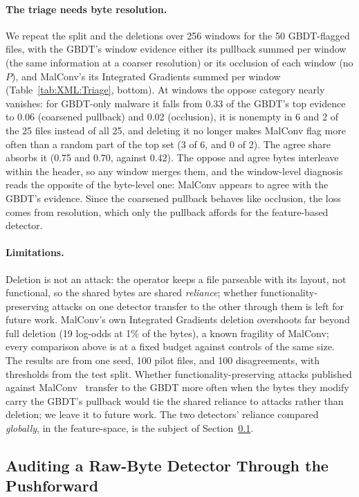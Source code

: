 \paragraph{The triage needs byte resolution.} We repeat the split and the deletions over 256 windows for the 50 GBDT-flagged files, with the GBDT's window evidence either its pullback summed per window (the same information at a coarser resolution) or its occlusion of each window (no $P$), and MalConv's its Integrated Gradients summed per window (Table~\ref{tab:XML:Triage}, bottom). At windows the oppose category nearly vanishes: for GBDT-only malware it falls from 0.33 of the GBDT's top evidence to 0.06 (coarsened pullback) and 0.02 (occlusion), it is nonempty in 6 and 2 of the 25 files instead of all 25, and deleting it no longer makes MalConv flag more often than a random part of the top set (3 of 6, and 0 of 2). The agree share absorbs it (0.75 and 0.70, against 0.42). The oppose and agree bytes interleave within the header, so any window merges them, and the window-level diagnosis reads the opposite of the byte-level one: MalConv appears to agree with the GBDT's evidence. Since the coarsened pullback behaves like occlusion, the loss comes from resolution, which only the pullback affords for the feature-based detector.

\paragraph{Limitations.} Deletion is not an attack: the operator keeps a file parseable with its layout, not functional, so the shared bytes are shared \emph{reliance}; whether functionality-preserving attacks on one detector transfer to the other through them is left for future work. MalConv's own Integrated Gradients deletion overshoots far beyond full deletion (19 log-odds at 1\% of the bytes), a known fragility of MalConv; every comparison above is at a fixed budget against controls of the same size. The results are from one seed, 100 pilot files, and 100 disagreements, with thresholds from the test split. Whether functionality-preserving attacks published against MalConv~\cite{demetrio2019explaining} transfer to the GBDT more often when the bytes they modify carry the GBDT's pullback would tie the shared reliance to attacks rather than deletion; we leave it to future work. The two detectors' reliance compared \emph{globally}, in the feature-space, is the subject of Section~\ref{sec:XML:Audit}.

\subsection{Auditing a Raw-Byte Detector Through the Pushforward}
\label{sec:XML:Audit}

